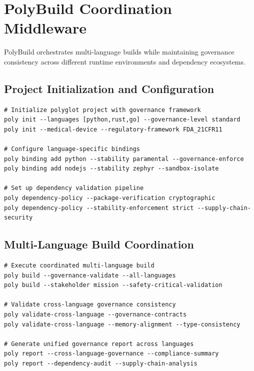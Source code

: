 \documentclass[11pt,letterpaper]{article}
\begin{document}
\section{PolyBuild Coordination Middleware}

PolyBuild orchestrates multi-language builds while maintaining governance consistency across different runtime environments and dependency ecosystems.

\subsection{Project Initialization and Configuration}

\begin{lstlisting}[language=shell, caption=PolyBuild Project Setup]
# Initialize polyglot project with governance framework
poly init --languages [python,rust,go] --governance-level standard
poly init --medical-device --regulatory-framework FDA_21CFR11

# Configure language-specific bindings
poly binding add python --stability paramental --governance-enforce
poly binding add nodejs --stability zephyr --sandbox-isolate

# Set up dependency validation pipeline
poly dependency-policy --package-verification cryptographic
poly dependency-policy --stability-enforcement strict --supply-chain-security
\end{lstlisting}

\subsection{Multi-Language Build Coordination}

\begin{lstlisting}[language=shell, caption=PolyBuild Coordination Commands]
# Execute coordinated multi-language build
poly build --governance-validate --all-languages
poly build --stakeholder mission --safety-critical-validation

# Validate cross-language governance consistency
poly validate-cross-language --governance-contracts
poly validate-cross-language --memory-alignment --type-consistency

# Generate unified governance report across languages
poly report --cross-language-governance --compliance-summary
poly report --dependency-audit --supply-chain-analysis
\end{lstlisting}
\end{document}
